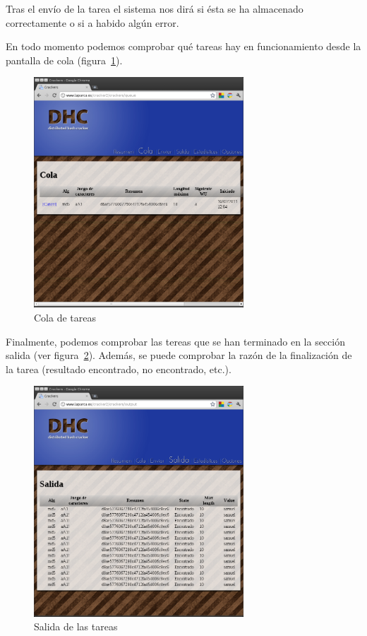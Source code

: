 Tras el envío de la tarea el sistema nos dirá si ésta se ha almacenado correctamente o si a habido algún error.

En todo momento podemos comprobar qué tareas hay en funcionamiento desde la pantalla de cola (figura~\ref{fig:DHC_cola}).

\begin{figure}
	\centering
	\includegraphics[width=0.7\textwidth]{images/cola.png}
	\caption{Cola de tareas}\label{fig:DHC_cola}
\end{figure}

Finalmente, podemos comprobar las tereas que se han terminado en la sección salida (ver figura~\ref{fig:DHC_salida}). Además, se puede comprobar la razón de la finalización de la tarea (resultado encontrado, no encontrado, etc.).

\begin{figure}
	\centering
	\includegraphics[width=0.7\textwidth]{images/salida.png}
	\caption{Salida de las tareas}\label{fig:DHC_salida}
\end{figure}

